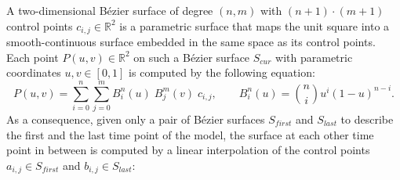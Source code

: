 \documentclass[11pt,a4paper, final]{article}
\begin{document}
%
A two-dimensional B\'ezier surface of degree $(n, m)$ with $(n+1) \cdot (m+1)$ control points $c_{i, j} \in \mathbb{R}^2$ is a parametric surface that maps the unit square into a smooth-continuous surface embedded in the same space as its control points. Each point $P(u, v) \in \mathbb{R}^2$ on such a B\'ezier surface $S_{cur}$ with parametric coordinates $u ,v \in [0,1]$ is computed by the following equation:
\begin{equation}
P(u, v) = \sum_{i=0}^{n} \sum_{j=0}^{m} B_{i}^{n} (u) \; B_{j}^{m} (v) \; c_{i,j}, \qquad B_{i}^{n} (u) = \binom{n}{i} u^i (1-u)^{n-i}.
\end{equation}
As a consequence, given only a pair of B\'ezier surfaces $S_{first}$ and $S_{last}$ to describe the first and the last time point of the model, the surface at each other time point in between is computed by a linear interpolation of the control points $a_{i,j} \in S_{first}$ and $b_{i,j} \in S_{last}$:
\end{document}
